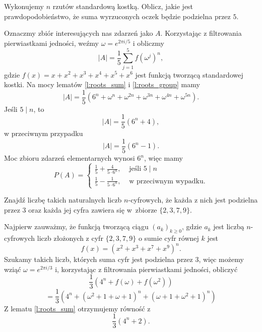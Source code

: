 \documentclass{scrartcl}
\begin{document}
    \begin{problem}[IMC 1999, B2]
        Wykonujemy $n$ rzutów standardową kostką. Oblicz, jakie jest prawdopodobieństwo, że suma wyrzuconych oczek będzie podzielna przez $5$.
        \begin{answer}
            Oznaczmy zbiór interesujących nas zdarzeń jako $A$. Korzystając z filtrowania pierwiastkami jedności, weźmy $\omega = e^{2\pi i / 5}$ i obliczmy
            $$ |A| = \frac{1}{5}\sum_{j = 1}^5 f(\omega^j)^n, $$
            gdzie $f(x) = x + x^2 + x^3 + x^4 + x^5 + x^6$ jest funkcją tworzącą standardowej kostki. Na mocy lematów \ref{l:roots_sum} i \ref{l:roots_group} mamy
            $$ |A| = \frac{1}{5}\left(6^n + \omega^n + \omega^{2n} + \omega^{3n} + \omega^{4n} + \omega^{5n}\right). $$
            Jeśli $5\mid n$, to
            $$ |A| = \frac{1}{5}\left(6^n + 4\right), $$
            w przeciwnym przypadku
            $$ |A| = \frac{1}{5}\left(6^n - 1\right). $$
            Moc zbioru zdarzeń elementarnych wynosi $6^n$, więc mamy
            $$ P(A) = \begin{cases}\frac{1}{5} + \frac{4}{5\cdot 6^n}, & \text{ jeśli } 5\mid n \\
                                   \frac{1}{5} - \frac{1}{5\cdot 6^n}, & \text{ w przeciwnym wypadku.} \end{cases} $$
        \end{answer}
    \end{problem}

    \begin{problem}
        Znajdź liczbę takich naturalnych liczb $n$-cyfrowych, że każda z nich jest podzielna przez $3$ oraz każda jej cyfra zawiera się w~zbiorze $\{2, 3, 7, 9\}$.
        \begin{answer}
            Najpierw zauważmy, że funkcją tworzącą ciągu $(a_k)_{k\geq 0}$, gdzie $a_k$ jest liczbą $n$-cyfrowych liczb złożonych z cyfr $\{2, 3, 7, 9\}$ o sumie cyfr równej $k$ jest
            $$ f(x) = \left(x^2 + x^3 + x^7 + x^9\right)^n. $$
            Szukamy takich liczb, których suma cyfr jest podzielna przez $3$, więc możemy wziąć $\omega = e^{2\pi i / 3}$ i, korzystając z filtrowania pierwiastkami jedności, obliczyć
            $$ \frac{1}{3}\left(4^n + f(\omega) + f(\omega^2)\right) $$
            $$ = \frac{1}{3}\left(4^n + \left(\omega^2 + 1 + \omega + 1\right)^n + \left(\omega + 1 + \omega^2 + 1\right)^n\right) $$
            Z lematu \ref{l:roots_sum} otrzymujemy równość z
            $$ \frac{1}{3}\left(4^n + 2\right). $$
        \end{answer}
    \end{problem}
\end{document}
